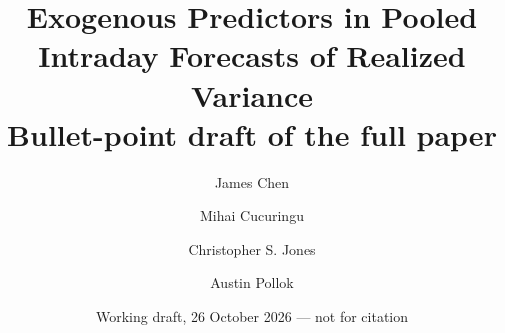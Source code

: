 \documentclass[11pt]{article}
\title{Exogenous Predictors in Pooled Intraday Forecasts of Realized Variance\ifauthornotes\\\large Bullet-point
draft of the full paper\fi}
\author{James Chen \and Mihai Cucuringu \and Christopher S. Jones \and Austin Pollok}
\date{Working draft, 26 October 2026 --- not for citation}
\begin{document}
\maketitle

\begin{abstract}

\end{abstract}
\end{document}
